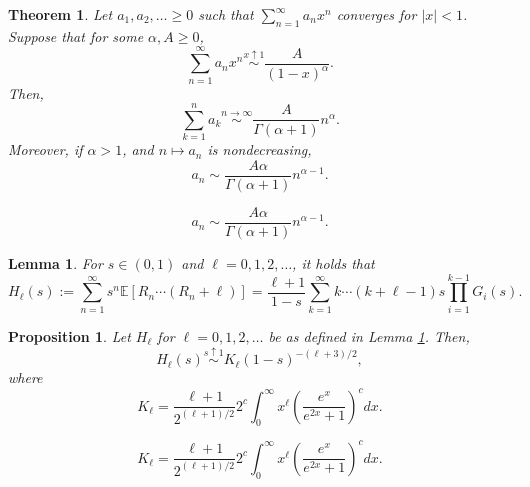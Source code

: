 \documentclass[10pt,a4paper]{amsart}
\newtheorem{thm}{Theorem}
\newtheorem{lem}{Lemma}
\newtheorem{pro}{Proposition}
\begin{document}
\begin{thm}\label{thm-3.1}
Let $a_{1}, a_{2}, \ldots \geq 0$ such that $\sum_{n=1}^{\infty} a_{n} x^{n}$ converges for $|x|<1$. Suppose that for some $\alpha, A \geq 0$,
\begin{equation*}
\sum_{n=1}^{\infty} a_{n} x^{n} \stackrel{x \uparrow 1}{\sim} \frac{A}{(1-x)^{\alpha}}.
\end{equation*}
Then,
\begin{equation*}
\sum_{k=1}^{n} a_{k} \stackrel{n \rightarrow \infty}{\sim} \frac{A}{\Gamma(\alpha+1)} n^{\alpha}.
\end{equation*}
Moreover, if $\alpha>1$, and $n \mapsto a_{n}$ is nondecreasing,
\begin{equation}\label{3.2-a}
a_{n} \sim \frac{A \alpha}{\Gamma(\alpha+1)} n^{\alpha-1}.
\end{equation}
\end{thm}

\begin{equation}
a_{n} \sim \frac{A \alpha}{\Gamma(\alpha+1)} n^{\alpha-1}.
\end{equation}

\begin{lem}\label{lem-3.4}
For $s \in(0,1)$ and $ \ell=0,1,2, \ldots$, it holds
that
\begin{equation}\label{3.15-a}
H_{\ell}(s):=\sum_{n=1}^{\infty} s^{n} \mathbb{E}\left[R_{n} \cdots\left(R_{n}+\ell\right)\right]=\frac{\ell+1}{1-s} \sum_{k=1}^{\infty} k \cdots(k+\ell-1) s \prod_{i=1}^{k-1} G_{i}(s).
\end{equation}
\end{lem}

\begin{pro}\label{pro-3.5}
Let $H_\ell$ for $\ell = 0, 1, 2, \ldots$ be as defined in Lemma \ref{lem-3.4}. Then,
\begin{equation*}
H_\ell(s) \stackrel{s \uparrow 1}{\sim} K_{\ell}(1-s)^{-(\ell+3)/2} ,
\end{equation*}
where
\begin{equation}\label{3.15}
K_{\ell}=\frac{\ell+1}{2^{(\ell+1)/2}}2^{c}\int_{0}^{\infty}x^{\ell}\left(\frac{e^{x}}{e^{2x}+1}\right)^{c}dx.
\end{equation}
\end{pro}

\begin{equation}
K_{\ell}=\frac{\ell+1}{2^{(\ell+1)/2}}2^{c}\int_{0}^{\infty}x^{\ell}\left(\frac{e^{x}}{e^{2x}+1}\right)^{c}dx.
\end{equation}
\end{document}
